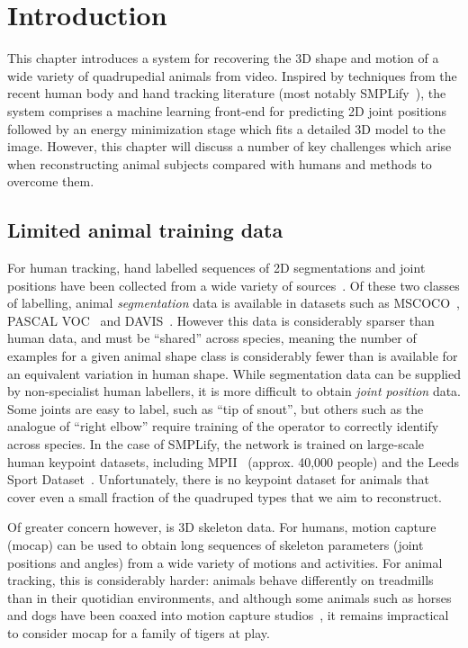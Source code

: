 
\section{Introduction}

This chapter introduces a system for recovering the 3D shape and motion of a wide variety of quadrupedial animals from video. Inspired by techniques from the recent human body and hand tracking literature (most notably SMPLify~\cite{bogo16keep}), the system comprises a machine learning front-end for predicting 2D joint positions followed by an energy minimization stage which fits a detailed 3D model to the image. However, this chapter will discuss a number of key challenges which arise when reconstructing animal subjects compared with humans and methods to overcome them.

\subsection{Limited animal training data}
For human tracking, hand labelled sequences of 2D segmentations and joint positions have been collected from a wide variety of sources~\cite{andriluka14cvpr,lin2014microsoft,johnson2010clustered}. Of these two classes of labelling, animal {\em segmentation} data is available in datasets such as MSCOCO~\cite{lin2014microsoft}, PASCAL VOC~\cite{everingham2010pascal} and DAVIS~\cite{Perazzi2016}.  However this data is considerably sparser than human data, and must be ``shared'' across species, meaning the number of examples for a given animal shape class is considerably fewer than is available for an equivalent variation in human shape.  While segmentation data can be supplied by non-specialist human labellers, it is more difficult to obtain {\em joint position} data.  Some joints are easy to label, such as ``tip of snout'', but others such as the analogue of ``right elbow'' require training of the operator to correctly identify across species. In the case of SMPLify, the network is trained on large-scale human keypoint datasets, including MPII~\cite{andriluka14cvpr} (approx. 40,000 people) and the Leeds Sport Dataset~\cite{johnson2010clustered}. Unfortunately, there is no keypoint dataset for animals that cover even a small fraction of the quadruped types that we aim to reconstruct. 

Of greater concern however, is 3D skeleton data.  For humans, motion capture (mocap) can be used to obtain long sequences of skeleton parameters (joint positions and angles) from a wide variety of motions and activities. For animal tracking, this is considerably harder: animals behave differently on treadmills than in their quotidian environments, and although some animals such as horses and dogs have been coaxed into motion capture studios~\cite{wilhelm2015furyexplorer}, it remains impractical to consider mocap for a family of tigers at play.

